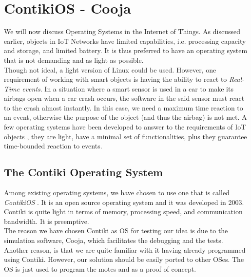 
\chapter{ContikiOS - Cooja}

We will now discuss Operating Systems in the Internet of Things. As discussed earlier, objects in IoT Networks have limited capabilities, i.e. processing capacity and storage, and limited battery. It is thus preferred to have an operating system that is not demanding and as light as possible. \\

Though not ideal, a light version of Linux could be used. However, one requirement of working with smart objects is having the ability to react to \textit{Real-Time events}. In a situation where a smart sensor is used in a car to make its airbags open when a car crash occurs, the software in the said sensor must react to the crash almost instantly. In this case, we need a maximum time reaction to an event, otherwise the purpose of the object (and thus the airbag) is not met. A few operating systems have been developed to answer to the requirements of IoT objects \cite{website:iot_os}, they are light, have a minimal set of functionalities, plus they guarantee time-bounded reaction to events.\\

\section{The Contiki Operating System}

Among existing operating systems, we have chosen to use one that is called \textit{ContikiOS} \cite{website:contiki}. It is an open source operating system and it was developed in 2003. Contiki is quite light in terms of memory, processing speed, and communication bandwidth. It is preemptive.\\

The reason we have chosen Contiki as OS for testing our idea is due to the simulation software, Cooja, which facilitates the debugging and the tests. Another reason, is that we are quite familiar with it having already programmed using Contiki. However, our solution should be easily ported to other OSes. The OS is just used to program the motes and as a proof of concept.\\

